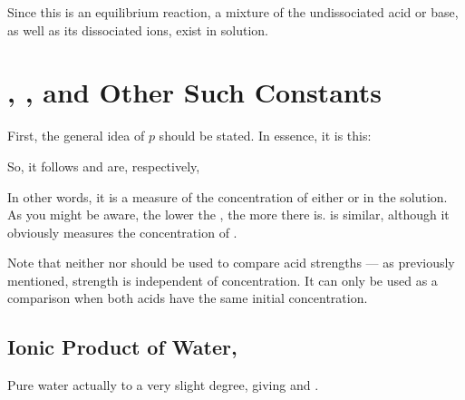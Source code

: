 				Since this is an equilibrium reaction, a mixture of the undissociated acid or base, as well as its dissociated ions,
				exist in solution.




	\section{\texorpdfstring{\pH{}}{pH}, \texorpdfstring{\pOH{}}{pOH}, and Other Such Constants}

		First, the general idea of $p$ should be stated. In essence, it is this:

		\mathdiagram{
			\[ \Mp{X} = -\lg{X}, \hspace{5mm} X = 10^{-\Mp{X}} \]
		}

		So, it follows \pH{} and \pOH{} are, respectively,


		In other words, it is a measure of the concentration of either  or  in the solution. As you might be aware, the
		lower the \pH{}, the more  there is. \pOH{} is similar, although it obviously measures the concentration of .

		Note that neither \pH{} nor \pOH{} should be used to compare acid strengths --- as previously mentioned, strength is independent
		of concentration. It can only be used as a comparison when both acids have the same initial concentration.


		\pagebreak
		\subsection{Ionic Product of Water, \texorpdfstring{\Kw{}}{Kw}}

			Pure water actually  to a very slight degree, giving  and .


